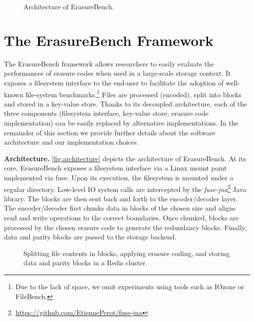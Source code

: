 \begin{figure}[t]
    \centering
    
    \caption{Architecture of ErasureBench.}
    \label{fig:architecture}
\end{figure}

\section{The ErasureBench Framework}
\label{sec:erasure-tester}

The ErasureBench framework allows researchers to easily evaluate the performances of erasure codes when used in a large-scale storage context.
It exposes a filesystem interface to the end-user to facilitate the adoption of well-known file-system benchmarks.\footnote{Due to the lack of space, we omit experiments using tools such as IOzone or FileBench.}
Files are processed (encoded), split into blocks and stored in a key-value store.
Thanks to its decoupled architecture, each of the three components (filesystem interface, key-value store, erasure code implementation) can be easily replaced by alternative implementations. 
In the remainder of this section we provide further details about the software architecture and our implementation choices.

\textbf{Architecture.} \autoref{fig:architecture} depicts the architecture of ErasureBench.
At its core, ErasureBench exposes a filesystem interface via a Linux mount point implemented via \ac{fuse}. 
Upon its execution, the filesystem is mounted under a regular directory. 
Low-level IO system calls are intercepted by the \textit{fuse-jna}\footnote{\url{https://github.com/EtiennePerot/fuse-jna}} Java library.
The blocks are then sent back and forth to the encoder/decoder layer. 
The encoder/decoder first chunks data in blocks of the chosen size and aligns read and write operations to the correct boundaries. 
Once chunked, blocks are  processed by the chosen erasure code to generate the redundancy blocks. 
Finally, data and parity blocks are passed to the storage backend.

\begin{figure}[t]
    \centering
    
    \caption{Splitting file contents in blocks, applying erasure coding, and storing data and parity blocks in a Redis cluster.}
    \label{fig:blocks}
\end{figure}

